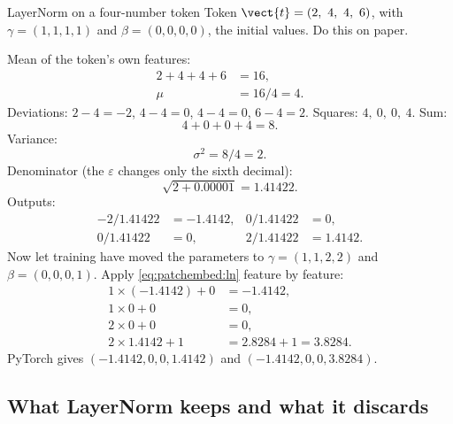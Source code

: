 \begin{worked}[label={we:patchembed:ln}]{LayerNorm on a four-number token}
Token $\vect{t} = (2,\ 4,\ 4,\ 6)$, with $\gamma = (1,1,1,1)$ and $\beta = (0,0,0,0)$, the initial
values. Do this on paper.

Mean of the token's own features:
\begin{align*}
2 + 4 + 4 + 6 &= 16,\\
\mu &= 16/4 = 4.
\end{align*}
Deviations: $2-4 = -2$, $4-4 = 0$, $4-4 = 0$, $6-4 = 2$. Squares: $4,\ 0,\ 0,\ 4$. Sum:
\[
4 + 0 + 0 + 4 = 8.
\]
Variance:
\[
\sigma^2 = 8/4 = 2.
\]
Denominator (the $\varepsilon$ changes only the sixth decimal):
\[
\sqrt{2 + 0.00001} = 1.41422.
\]
Outputs:
\begin{align*}
-2/1.41422 &= -1.4142, & 0/1.41422 &= 0,\\
0/1.41422 &= 0, & 2/1.41422 &= 1.4142.
\end{align*}
Now let training have moved the parameters to $\gamma = (1,1,2,2)$ and $\beta = (0,0,0,1)$. Apply
\cref{eq:patchembed:ln} feature by feature:
\begin{align*}
1\times(-1.4142) + 0 &= -1.4142,\\
1\times0 + 0 &= 0,\\
2\times0 + 0 &= 0,\\
2\times1.4142 + 1 &= 2.8284 + 1 = 3.8284.
\end{align*}
PyTorch gives $(-1.4142, 0, 0, 1.4142)$ and $(-1.4142, 0, 0, 3.8284)$\tagC.
\end{worked}

\subsection{What LayerNorm keeps and what it discards}

